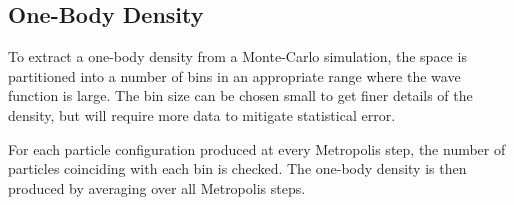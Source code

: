 \subsection{One-Body Density}
To extract a one-body density from a Monte-Carlo simulation, the space is
partitioned into a number of bins in an appropriate range where the wave
function is large. The bin size can be chosen small to get finer details of the
density, but will require more data to mitigate statistical error. 

For each particle configuration produced at every Metropolis step, the number of
particles coinciding with each bin is checked. The one-body density is then
produced by averaging over all Metropolis steps. 


